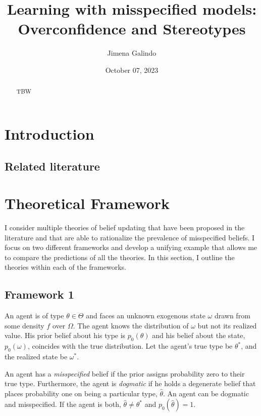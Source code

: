 \documentclass[
  12pt,
]{article}
\title{Learning with misspecified models: Overconfidence and
Stereotypes}
\author{Jimena Galindo}
\date{October 07, 2023}
\begin{document}
\maketitle
\begin{abstract}
TBW
\end{abstract}

\hypertarget{introduction}{%
\section{Introduction}\label{introduction}}

\hypertarget{related-literature}{%
\subsection{Related literature}\label{related-literature}}

\hypertarget{theoretical-framework}{%
\section{Theoretical Framework}\label{theoretical-framework}}

I consider multiple theories of belief updating that have been proposed
in the literature and that are able to rationalize the prevalence of
misspecified beliefs. I focus on two different frameworks and develop a
unifying example that allows me to compare the predictions of all the
theories. In this section, I outline the theories within each of the
frameworks.

\hypertarget{framework-1}{%
\subsection{Framework 1}\label{framework-1}}

An agent is of type \(\theta \in \Theta\) and faces an unknown exogenous
state \(\omega\) drawn from some density \(f\) over \(\Omega\). The
agent knows the distribution of \(\omega\) but not its realized value.
His prior belief about his type is \(p_0(\theta)\) and his belief about
the state, \(p_0(\omega)\), coincides with the true distribution. Let
the agent's true type be \(\theta^{*}\), and the realized state be
\(\omega^{*}\).

An agent has a \emph{misspecified} belief if the prior assigns
probability zero to their true type. Furthermore, the agent is
\emph{dogmatic} if he holds a degenerate belief that places probability
one on being a particular type, \(\hat{\theta}\). An agent can be
dogmatic and misspecified. If the agent is both,
\(\hat{\theta} \neq \theta^*\) and \(p_0(\hat{\theta}) = 1\).
\end{document}
